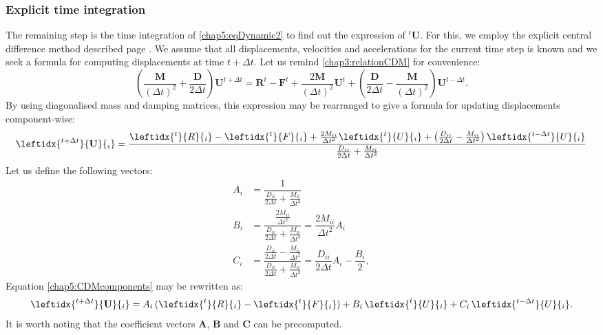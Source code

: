 		\subsubsection*{Explicit time integration}
The remaining step is the time integration of \eqref{chap5:eqDynamic2} to find out the expression of $ ^t\mathbf{U} $. For this, we employ the explicit central difference method described page \pageref{chap3:centralDifferenceMethod}. We assume that all displacements, velocities and accelerations for the current time step is known and we seek a formula for computing displacements at time $ t+\Delta t $. Let us remind \eqref{chap3:relationCDM} for convenience:
\begin{equation}
\left( \dfrac{\mathbf{M}}{(\Delta t)^2} + \dfrac{\mathbf{D}}{2 \Delta t} \right) \mathbf{U}^{t+\Delta t} = \mathbf{R}^t - \mathbf{F}^t + \dfrac{2 \mathbf{M}}{(\Delta t)^2} \mathbf{U}^t + \left( \dfrac{\mathbf{D}}{2 \Delta t} - \dfrac{\mathbf{M}}{(\Delta t)^2} \right) \mathbf{U}^{t-\Delta t}.
\end{equation}
By using diagonalised mass and damping matrices, this expression may be rearranged to give a formula for updating displacements component-wise:
\begin{equation}
\label{chap5:CDMcomponents}
\leftidx{^{t+\Delta t}}{ \mathbf{U} }{_i} = \dfrac{\leftidx{^t}{R}{_i} - \leftidx{^t}{F}{_i} + \frac{2 M_{ii}}{\Delta t^2} \leftidx{^t}{U}{_i}  + \left( \frac{D_{ii}}{2 \Delta t} -\frac{M_{ii}}{\Delta t^2} \right) \leftidx{^{t-\Delta t}}{U}{_i} }{ \frac{D_{ii}}{2 \Delta t} +\frac{M_{ii}}{\Delta t^2} }
\end{equation}
Let us define the following vectors:
\begin{align}
A_i &= \dfrac{1}{ \frac{D_{ii}}{2 \Delta t} +\frac{M_{ii}}{\Delta t^2} } \\
B_i &= \dfrac{ \frac{2 M_{ii}}{\Delta t^2} }{ \frac{D_{ii}}{2 \Delta t} +\frac{M_{ii}}{\Delta t^2} } = \dfrac{2 M_{ii}}{\Delta t^2} A_i \\
C_i &= \dfrac{ \frac{D_{ii}}{2 \Delta t} -\frac{M_{ii}}{\Delta t^2} }{ \frac{D_{ii}}{2 \Delta t} +\frac{M_{ii}}{\Delta t^2} } = \dfrac{D_{ii}}{2\Delta t} A_i - \dfrac{B_i}{2},
\end{align}
Equation \eqref{chap5:CDMcomponents} may be rewritten as:
\begin{equation}
\leftidx{^{t+\Delta t}}{ \mathbf{U} }{_i} = A_i \, (\leftidx{^t}{R}{_i} - \leftidx{^t}{F}{_i}) + B_i \, \leftidx{^t}{U}{_i} + C_i \, \leftidx{^{t-\Delta t}}{U}{_i}.
\end{equation}
It is worth noting that the coefficient vectors $ \mathbf{A} $, $ \mathbf{B} $ and $ \mathbf{C} $ can be precomputed. 

